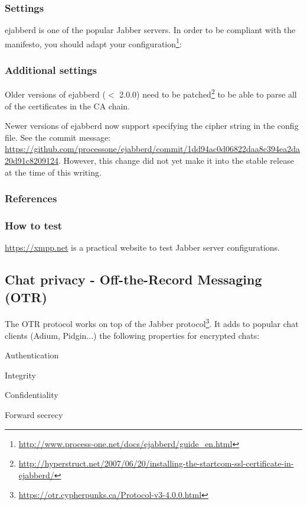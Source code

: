 \subsubsection{Settings}
ejabberd is one of the popular Jabber servers. In order to be compliant
with the manifesto, you should adapt your configuration\footnote{\url{http://www.process-one.net/docs/ejabberd/guide_en.html}}:

% 
\subsubsection{Additional settings}
Older versions of ejabberd ($ < $ 2.0.0) need to be patched\footnote{\url{http://hyperstruct.net/2007/06/20/installing-the-startcom-ssl-certificate-in-ejabberd/}} to be able to parse all of the certificates in the CA chain.

Newer versions of ejabberd now support specifying the cipher string in the config file. See the commit message: \url{https://github.com/processone/ejabberd/commit/1dd94ac0d06822daa8c394ea2da20d91c8209124}. However, this change did not yet make it into the stable release at the time of this writing. 


\subsubsection{References}



\subsubsection{How to test}
\begin{itemize*}
  \item \url{https://xmpp.net} is a practical website to test Jabber server configurations.
\end{itemize*}


\subsection{Chat privacy - Off-the-Record Messaging (OTR)}

The OTR protocol works on top of the Jabber protocol\footnote{\url{https://otr.cypherpunks.ca/Protocol-v3-4.0.0.html}}.  
It adds to popular chat clients (Adium, Pidgin...) the following properties for encrypted chats:
\begin{itemize*}
  \item Authentication
  \item Integrity
  \item Confidentiality
  \item Forward secrecy
\end{itemize*}

